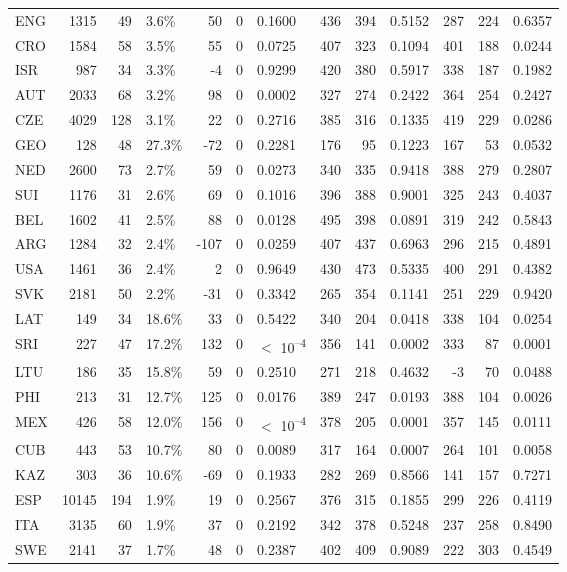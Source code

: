 \begin{tabular}[t]{lrrlrrlrrlrrl}
ENG & 1315 & 49 & 3.6\% & 50 & 0 & 0.1600 & 436 & 394 & 0.5152 & 287 & 224 & 0.6357\\
CRO & 1584 & 58 & 3.5\% & 55 & 0 & 0.0725 & 407 & 323 & 0.1094 & 401 & 188 & 0.0244\\
ISR & 987 & 34 & 3.3\% & -4 & 0 & 0.9299 & 420 & 380 & 0.5917 & 338 & 187 & 0.1982\\
AUT & 2033 & 68 & 3.2\% & 98 & 0 & 0.0002 & 327 & 274 & 0.2422 & 364 & 254 & 0.2427\\
CZE & 4029 & 128 & 3.1\% & 22 & 0 & 0.2716 & 385 & 316 & 0.1335 & 419 & 229 & 0.0286\\
GEO & 128 & 48 & 27.3\% & -72 & 0 & 0.2281 & 176 & 95 & 0.1223 & 167 & 53 & 0.0532\\
NED & 2600 & 73 & 2.7\% & 59 & 0 & 0.0273 & 340 & 335 & 0.9418 & 388 & 279 & 0.2807\\
SUI & 1176 & 31 & 2.6\% & 69 & 0 & 0.1016 & 396 & 388 & 0.9001 & 325 & 243 & 0.4037\\
BEL & 1602 & 41 & 2.5\% & 88 & 0 & 0.0128 & 495 & 398 & 0.0891 & 319 & 242 & 0.5843\\
ARG & 1284 & 32 & 2.4\% & -107 & 0 & 0.0259 & 407 & 437 & 0.6963 & 296 & 215 & 0.4891\\
USA & 1461 & 36 & 2.4\% & 2 & 0 & 0.9649 & 430 & 473 & 0.5335 & 400 & 291 & 0.4382\\
SVK & 2181 & 50 & 2.2\% & -31 & 0 & 0.3342 & 265 & 354 & 0.1141 & 251 & 229 & 0.9420\\
LAT & 149 & 34 & 18.6\% & 33 & 0 & 0.5422 & 340 & 204 & 0.0418 & 338 & 104 & 0.0254\\
SRI & 227 & 47 & 17.2\% & 132 & 0 & $<$ 10\textsuperscript{--4} & 356 & 141 & 0.0002 & 333 & 87 & 0.0001\\
LTU & 186 & 35 & 15.8\% & 59 & 0 & 0.2510 & 271 & 218 & 0.4632 & -3 & 70 & 0.0488\\
PHI & 213 & 31 & 12.7\% & 125 & 0 & 0.0176 & 389 & 247 & 0.0193 & 388 & 104 & 0.0026\\
MEX & 426 & 58 & 12.0\% & 156 & 0 & $<$ 10\textsuperscript{--4} & 378 & 205 & 0.0001 & 357 & 145 & 0.0111\\
CUB & 443 & 53 & 10.7\% & 80 & 0 & 0.0089 & 317 & 164 & 0.0007 & 264 & 101 & 0.0058\\
KAZ & 303 & 36 & 10.6\% & -69 & 0 & 0.1933 & 282 & 269 & 0.8566 & 141 & 157 & 0.7271\\
ESP & 10145 & 194 & 1.9\% & 19 & 0 & 0.2567 & 376 & 315 & 0.1855 & 299 & 226 & 0.4119\\
ITA & 3135 & 60 & 1.9\% & 37 & 0 & 0.2192 & 342 & 378 & 0.5248 & 237 & 258 & 0.8490\\
SWE & 2141 & 37 & 1.7\% & 48 & 0 & 0.2387 & 402 & 409 & 0.9089 & 222 & 303 & 0.4549\\
\bottomrule
\end{tabular}
